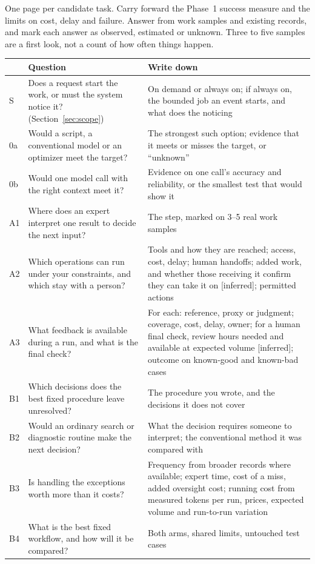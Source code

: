 \documentclass[10pt]{article}
\newcommand{\inferred}{\textsf{\small[inferred]}}
\begin{document}
One page per candidate task. Carry forward the Phase~1 success measure and the limits on cost, delay and failure. Answer from work samples and existing records, and mark each answer as observed, estimated or unknown. Three to five samples are a first look, not a count of how often things happen.

\begin{center}
\small
\begin{tabularx}{\linewidth}{@{}l L L@{}}
\toprule
 & Question & Write down \\
\midrule
S & Does a request start the work, or must the system notice it? (Section~\ref{sec:scope}) & On demand or always on; if always on, the bounded job an event starts, and what does the noticing \\
0a & Would a script, a conventional model or an optimizer meet the target? & The strongest such option; evidence that it meets or misses the target, or ``unknown'' \\
0b & Would one model call with the right context meet it? & Evidence on one call's accuracy and reliability, or the smallest test that would show it \\
A1 & Where does an expert interpret one result to decide the next input? & The step, marked on 3--5 real work samples \\
A2 & Which operations can run under your constraints, and which stay with a person? & Tools and how they are reached; access, cost, delay; human handoffs; added work, and whether those receiving it confirm they can take it on \inferred; permitted actions \\
A3 & What feedback is available during a run, and what is the final check? & For each: reference, proxy or judgment; coverage, cost, delay, owner; for a human final check, review hours needed and available at expected volume \inferred; outcome on known-good and known-bad cases \\
B1 & Which decisions does the best fixed procedure leave unresolved? & The procedure you wrote, and the decisions it does not cover \\
B2 & Would an ordinary search or diagnostic routine make the next decision? & What the decision requires someone to interpret; the conventional method it was compared with \\
B3 & Is handling the exceptions worth more than it costs? & Frequency from broader records where available; expert time, cost of a miss, added oversight cost; running cost from measured tokens per run, prices, expected volume and run-to-run variation \\
B4 & What is the best fixed workflow, and how will it be compared? & Both arms, shared limits, untouched test cases \\
\bottomrule
\end{tabularx}
\end{center}
\end{document}
